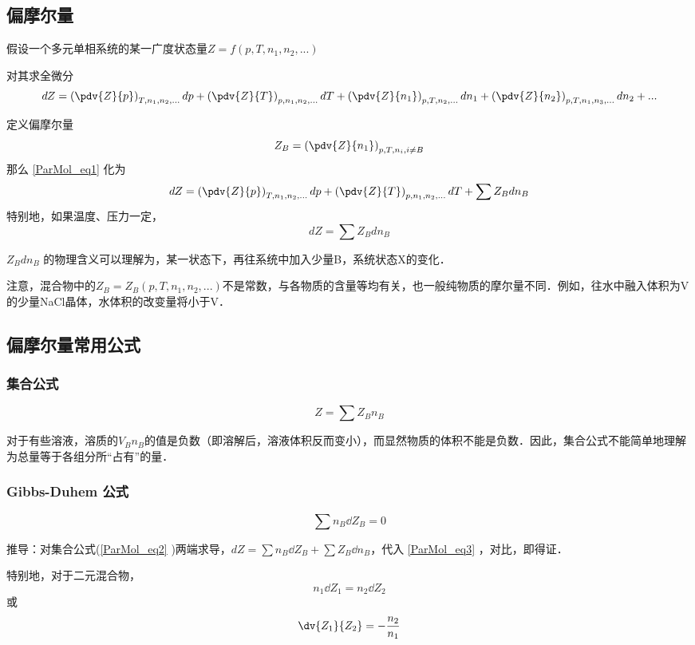 \subsection{偏摩尔量}
假设一个多元单相系统的某一广度状态量$Z=f(p,T,n_1,n_2,...)$

对其求全微分
\begin{equation}\label{ParMol_eq1}
dZ = \left(\pdv{Z}{p}\right)_{T,n_1,n_2,...}dp + \left(\pdv{Z}{T}\right)_{p,n_1,n_2,...}dT+\left(\pdv{Z}{n_1}\right)_{p,T,n_2,...}dn_1+\left(\pdv{Z}{n_2}\right)_{p,T,n_1,n_3,...}dn_2+...
\end{equation}

定义偏摩尔量
\begin{equation}
{Z_B} = \left(\pdv{Z}{n_1}\right)_{p,T,n_i, i \neq B} 
\end{equation}
那么 \autoref{ParMol_eq1} 化为 
\begin{equation}
dZ = \left(\pdv{Z}{p}\right)_{T,n_1,n_2,...}dp + \left(\pdv{Z}{T}\right)_{p,n_1,n_2,...}dT+\sum {Z_B} dn_B
\end{equation}
特别地，如果温度、压力一定，
\begin{equation}\label{ParMol_eq3}
dZ = \sum {Z_B} dn_B
\end{equation}

${Z_B} d n_B$ 的物理含义可以理解为，某一状态下，再往系统中加入少量B，系统状态X的变化．

注意，混合物中的${Z_B}={Z_B}(p,T,n_1,n_2,...)$不是常数，与各物质的含量等均有关，也一般纯物质的摩尔量不同．例如，往水中融入体积为V的少量NaCl晶体，水体积的改变量将小于V．

\subsection{偏摩尔量常用公式}
\subsubsection{集合公式}
\begin{equation}\label{ParMol_eq2}
Z=\sum {Z_B}  n_B
\end{equation}

对于有些溶液，溶质的${V_B}  n_B$的值是负数（即溶解后，溶液体积反而变小），而显然物质的体积不能是负数．因此，集合公式不能简单地理解为总量等于各组分所“占有”的量．

\subsubsection{Gibbs-Duhem 公式}
\begin{equation}
\sum n_B \dd Z_B = 0
\end{equation}

推导：对集合公式(\autoref{ParMol_eq2} )两端求导，$dZ=\sum n_B \dd Z_B + \sum {Z_B}  \dd n_B$，代入 \autoref{ParMol_eq3} ，对比，即得证．

特别地，对于二元混合物，
\begin{equation}
n_1 \dd {Z_1} = n_2 \dd {Z_2}
\end{equation}
或
\begin{equation}
\dv{Z_1}{Z_2}=-\frac{n_2}{n_1}
\end{equation}


